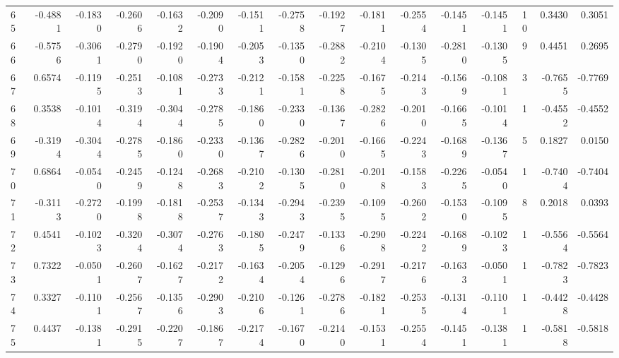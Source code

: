 \begin{tabular}{lrrrrrrrrrrrrrrr}
65  &     -0.4881 & -0.1830 & -0.2606 & -0.1632 & -0.2090 & -0.1511 & -0.2758 & -0.1927 & -0.1811 & -0.2554 &  -0.1451 &    -0.1451 &     10 &                    0.3430 &                     0.3051 \\
66  &     -0.5756 & -0.3061 & -0.2790 & -0.1920 & -0.1904 & -0.2053 & -0.1350 & -0.2882 & -0.2104 & -0.1305 &  -0.2810 &    -0.1305 &      9 &                    0.4451 &                     0.2695 \\
67  &      0.6574 & -0.1195 & -0.2513 & -0.1081 & -0.2733 & -0.2121 & -0.1581 & -0.2258 & -0.1675 & -0.2143 &  -0.1569 &    -0.1081 &      3 &                   -0.7655 &                    -0.7769 \\
68  &      0.3538 & -0.1014 & -0.3194 & -0.3044 & -0.2785 & -0.1860 & -0.2330 & -0.1367 & -0.2826 & -0.2010 &  -0.1665 &    -0.1014 &      1 &                   -0.4552 &                    -0.4552 \\
69  &     -0.3194 & -0.3044 & -0.2785 & -0.1860 & -0.2330 & -0.1367 & -0.2826 & -0.2010 & -0.1665 & -0.2243 &  -0.1689 &    -0.1367 &      5 &                    0.1827 &                     0.0150 \\
70  &      0.6864 & -0.0540 & -0.2459 & -0.1248 & -0.2683 & -0.2102 & -0.1305 & -0.2810 & -0.2018 & -0.1583 &  -0.2265 &    -0.0540 &      1 &                   -0.7404 &                    -0.7404 \\
71  &     -0.3113 & -0.2720 & -0.1998 & -0.1818 & -0.2537 & -0.1343 & -0.2943 & -0.2395 & -0.1095 & -0.2602 &  -0.1530 &    -0.1095 &      8 &                    0.2018 &                     0.0393 \\
72  &      0.4541 & -0.1023 & -0.3204 & -0.3074 & -0.2763 & -0.1805 & -0.2479 & -0.1336 & -0.2908 & -0.2242 &  -0.1689 &    -0.1023 &      1 &                   -0.5564 &                    -0.5564 \\
73  &      0.7322 & -0.0501 & -0.2607 & -0.1627 & -0.2172 & -0.1634 & -0.2054 & -0.1296 & -0.2917 & -0.2176 &  -0.1633 &    -0.0501 &      1 &                   -0.7823 &                    -0.7823 \\
74  &      0.3327 & -0.1101 & -0.2567 & -0.1356 & -0.2903 & -0.2106 & -0.1261 & -0.2786 & -0.1821 & -0.2535 &  -0.1314 &    -0.1101 &      1 &                   -0.4428 &                    -0.4428 \\
75  &      0.4437 & -0.1381 & -0.2915 & -0.2207 & -0.1867 & -0.2174 & -0.1670 & -0.2140 & -0.1531 & -0.2554 &  -0.1451 &    -0.1381 &      1 &                   -0.5818 &                    -0.5818 \\

\end{tabular}
